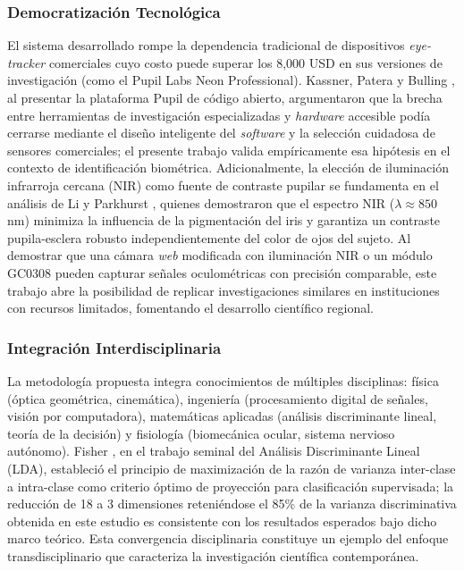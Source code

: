 \subsubsection{Democratización Tecnológica}

El sistema desarrollado rompe la dependencia tradicional de dispositivos \textit{eye-tracker} comerciales cuyo costo puede superar los 8,000 USD en sus versiones de investigación (como el Pupil Labs Neon Professional).
Kassner, Patera y Bulling \cite{kassner2014pupil}, al presentar la plataforma Pupil de código abierto, argumentaron que la brecha entre herramientas de investigación especializadas y \textit{hardware} accesible podía cerrarse mediante el diseño inteligente del \textit{software} y la selección cuidadosa de sensores comerciales;
el presente trabajo valida empíricamente esa hipótesis en el contexto de identificación biométrica.
Adicionalmente, la elección de iluminación infrarroja cercana (NIR) como fuente de contraste pupilar se fundamenta en el análisis de Li y Parkhurst \cite{li2005starburst}, quienes demostraron que el espectro NIR ($\lambda \approx 850$ nm) minimiza la influencia de la pigmentación del iris y garantiza un contraste pupila-esclera robusto independientemente del color de ojos del sujeto.
Al demostrar que una cámara \textit{web} modificada con iluminación NIR o un módulo GC0308 pueden capturar señales oculométricas con precisión comparable, este trabajo abre la posibilidad de replicar investigaciones similares en instituciones con recursos limitados, fomentando el desarrollo científico regional.
\subsubsection{Integración Interdisciplinaria}

La metodología propuesta integra conocimientos de múltiples disciplinas: física (óptica geométrica, cinemática), ingeniería (procesamiento digital de señales, visión por computadora), matemáticas aplicadas (análisis discriminante lineal, teoría de la decisión) y fisiología (biomecánica ocular, sistema nervioso autónomo).
Fisher \cite{fisher1936use}, en el trabajo seminal del Análisis Discriminante Lineal (LDA), estableció el principio de maximización de la razón de varianza inter-clase a intra-clase como criterio óptimo de proyección para clasificación supervisada;
la reducción de 18 a 3 dimensiones reteniéndose el 85\% de la varianza discriminativa obtenida en este estudio es consistente con los resultados esperados bajo dicho marco teórico.
Esta convergencia disciplinaria constituye un ejemplo del enfoque transdisciplinario que caracteriza la investigación científica contemporánea.
